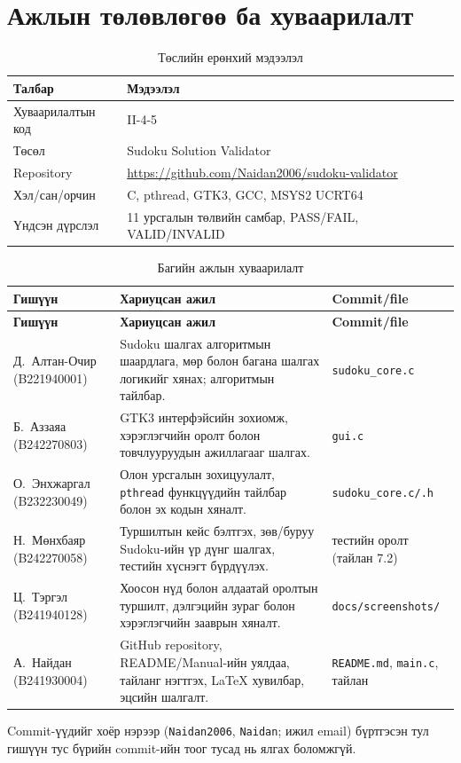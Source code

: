 \documentclass[12pt,a4paper]{report}
\newcommand{\repo}{\url{https://github.com/Naidan2006/sudoku-validator}}
\begin{document}
\chapter{Ажлын төлөвлөгөө ба хуваарилалт}
\begin{table}[H]\centering\caption{Төслийн ерөнхий мэдээлэл}\begin{tabular}{P{0.28\textwidth}P{0.62\textwidth}}\toprule
		\textbf{Талбар}&\textbf{Мэдээлэл}\\\midrule
		Хуваарилалтын код&II-4-5\\
		Төсөл&Sudoku Solution Validator\\
		Repository&\repo\\
		Хэл/сан/орчин&C, pthread, GTK3, GCC, MSYS2 UCRT64\\
		Үндсэн дүрслэл&11 урсгалын төлвийн самбар, PASS/FAIL, VALID/INVALID\\\bottomrule\end{tabular}\end{table}
\begin{longtable}{P{0.3\textwidth}P{0.4\textwidth}P{0.2\textwidth}}
	\caption{Багийн ажлын хуваарилалт}\\
	\toprule
	\textbf{Гишүүн} & \textbf{Хариуцсан ажил} & \textbf{Commit/file}\\
	\midrule\endfirsthead
	\toprule\textbf{Гишүүн} & \textbf{Хариуцсан ажил} & \textbf{Commit/file}\\\midrule\endhead
	Д.~Алтан-Очир (B221940001) & Sudoku шалгах алгоритмын шаардлага, мөр болон багана шалгах логикийг хянах; алгоритмын тайлбар. & \texttt{sudoku\_core.c}\\
	Б.~Аззаяа (B242270803) & GTK3 интерфэйсийн зохиомж, хэрэглэгчийн оролт болон товчлууруудын ажиллагааг шалгах. & \texttt{gui.c}\\
	О.~Энхжаргал (B232230049) & Олон урсгалын зохицуулалт, \texttt{pthread} функцүүдийн тайлбар болон эх кодын хяналт. & \texttt{sudoku\_core.c/.h}\\
	Н.~Мөнхбаяр (B242270058) & Туршилтын кейс бэлтгэх, зөв/буруу Sudoku-ийн үр дүнг шалгах, тестийн хүснэгт бүрдүүлэх. & тестийн оролт (тайлан 7.2)\\
	Ц.~Тэргэл (B241940128) & Хоосон нүд болон алдаатай оролтын туршилт, дэлгэцийн зураг болон хэрэглэгчийн зааврын хяналт. & \texttt{docs/screenshots/}\\
	А.~Найдан (B241930004) & GitHub repository, README/Manual-ийн уялдаа, тайланг нэгтгэх, LaTeX хувилбар, эцсийн шалгалт. & \texttt{README.md}, \texttt{main.c}, тайлан\\
	\bottomrule
\end{longtable}
Commit-үүдийг хоёр нэрээр (\texttt{Naidan2006}, \texttt{Naidan}; ижил email) бүртгэсэн тул гишүүн тус бүрийн commit-ийн тоог тусад нь ялгах боломжгүй.	
\end{document}
